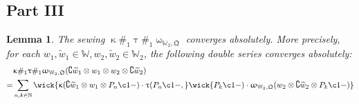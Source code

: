 \documentclass[11pt,b5paper,notitlepage]{article}
\theoremstyle{definition}
\theoremstyle{plain}
\newtheorem{lm}[df]{Lemma}
\newcommand{\fk}{\mathfrak}
\newcommand{\wtd}{\widetilde}
\newcommand{\Co}{\complement}
\newcommand{\Wbb}{\mathbb W}
\newcommand{\Nbb}{\mathbb N}
\numberwithin{equation}{section}
\begin{document}
\subsection{Part III}



\begin{lm}\label{lb54}
The sewing $\upkappa\#_1\uptau\#_1\upomega_{\Wbb_2,\fk Q}$ converges absolutely. More precisely, for each $w_1,\wtd w_1\in\Wbb,w_2,\wtd w_2\in\Wbb_2$, the following double series converges absolutely:
\begin{align*}
&\upkappa\#_1\uptau\#_1\upomega_{\Wbb_2,\fk Q}(\Co\wtd w_1\otimes w_1\otimes w_2\otimes\Co\wtd w_2)\\
=&\sum_{n,k\in\Nbb} \wick{\upkappa(\Co\wtd w_1\otimes w_1\otimes P_n\c1 -)\cdot \uptau(P_n\c1 -,}\wick{P_k \c1 -)\cdot \upomega_{\Wbb_2,\fk Q}(w_2\otimes\Co\wtd w_2\otimes P_k \c1 -) }
\end{align*}
\end{lm}
\end{document}
